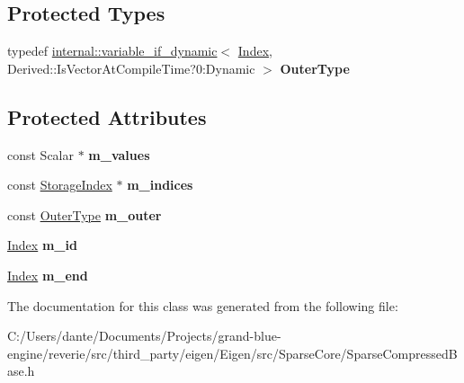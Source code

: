 \subsection*{Protected Types}
\begin{DoxyCompactItemize}
\item 
\mbox{\label{class_eigen_1_1_sparse_compressed_base_1_1_inner_iterator_a6d02d249b544148e7bb052541212185e}} 
typedef \mbox{\hyperlink{class_eigen_1_1internal_1_1variable__if__dynamic}{internal\+::variable\+\_\+if\+\_\+dynamic}}$<$ \mbox{\hyperlink{struct_eigen_1_1_eigen_base_a554f30542cc2316add4b1ea0a492ff02}{Index}}, Derived\+::\+Is\+Vector\+At\+Compile\+Time?0\+:Dynamic $>$ {\bfseries Outer\+Type}
\end{DoxyCompactItemize}
\subsection*{Protected Attributes}
\begin{DoxyCompactItemize}
\item 
\mbox{\label{class_eigen_1_1_sparse_compressed_base_1_1_inner_iterator_a952c16dc679544d3379d2dc986e601a2}} 
const Scalar $\ast$ {\bfseries m\+\_\+values}
\item 
\mbox{\label{class_eigen_1_1_sparse_compressed_base_1_1_inner_iterator_abb6cbaa6e3e1deb4c26c590a5a36bcef}} 
const \mbox{\hyperlink{class_eigen_1_1_sparse_matrix_base_a0b540ba724726ebe953f8c0df06081ed}{Storage\+Index}} $\ast$ {\bfseries m\+\_\+indices}
\item 
\mbox{\label{class_eigen_1_1_sparse_compressed_base_1_1_inner_iterator_a35be608b4ccded40a8c6aede6a151cee}} 
const \mbox{\hyperlink{class_eigen_1_1internal_1_1variable__if__dynamic}{Outer\+Type}} {\bfseries m\+\_\+outer}
\item 
\mbox{\label{class_eigen_1_1_sparse_compressed_base_1_1_inner_iterator_a53a38206a6d4dd249aab44e344862a04}} 
\mbox{\hyperlink{struct_eigen_1_1_eigen_base_a554f30542cc2316add4b1ea0a492ff02}{Index}} {\bfseries m\+\_\+id}
\item 
\mbox{\label{class_eigen_1_1_sparse_compressed_base_1_1_inner_iterator_a1f64c8c86a04eaa0bc0309a2a7dc841c}} 
\mbox{\hyperlink{struct_eigen_1_1_eigen_base_a554f30542cc2316add4b1ea0a492ff02}{Index}} {\bfseries m\+\_\+end}
\end{DoxyCompactItemize}


The documentation for this class was generated from the following file\+:\begin{DoxyCompactItemize}
\item 
C\+:/\+Users/dante/\+Documents/\+Projects/grand-\/blue-\/engine/reverie/src/third\+\_\+party/eigen/\+Eigen/src/\+Sparse\+Core/Sparse\+Compressed\+Base.\+h\end{DoxyCompactItemize}
